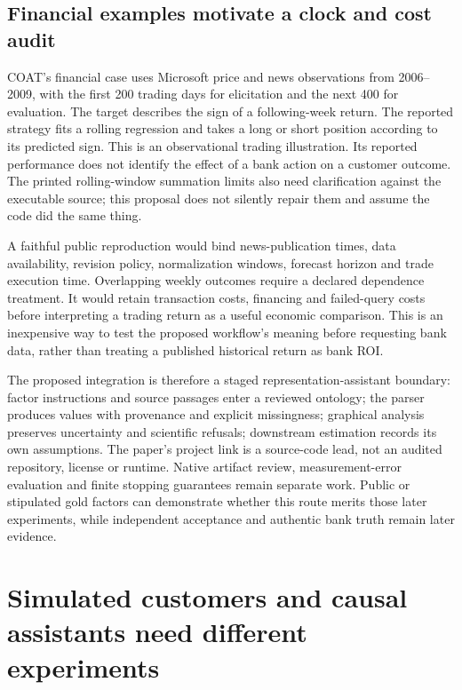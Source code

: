 \subsection{Financial examples motivate a clock and cost audit}
\label{exec19:coat-finance}
COAT's financial case uses Microsoft price and news observations from
2006--2009, with the first 200 trading days for elicitation and the next 400
for evaluation. The target describes the sign of a following-week return.
The reported strategy fits a rolling regression and takes a long or short
position according to its predicted sign. This is an observational trading
illustration. Its reported performance does not identify the effect of a bank
action on a customer outcome. The printed rolling-window summation limits
also need clarification against the executable source; this proposal does not
silently repair them and assume the code did the same thing.~\citep{exec19_coat}

A faithful public reproduction would bind news-publication times, data
availability, revision policy, normalization windows, forecast horizon and
trade execution time. Overlapping weekly outcomes require a declared
dependence treatment. It would retain transaction costs, financing and
failed-query costs before interpreting a trading return as a useful economic
comparison. This is an inexpensive way to test the proposed workflow's
meaning before requesting bank data, rather than treating a published
historical return as bank ROI.

The proposed integration is therefore a staged representation-assistant
boundary: factor instructions and source passages enter a reviewed ontology;
the parser produces values with provenance and explicit missingness; graphical
analysis preserves uncertainty and scientific refusals; downstream estimation
records its own assumptions. The paper's project link is a source-code lead,
not an audited repository, license or runtime. Native artifact review,
measurement-error evaluation and finite stopping guarantees remain separate
work. Public or stipulated gold factors can demonstrate whether this route
merits those later experiments, while independent acceptance and authentic
bank truth remain later evidence.~\citep{exec19_coat,exec19_coat_reference}


\section{Simulated customers and causal assistants need different experiments}
\label{exec20:pa-scope}

